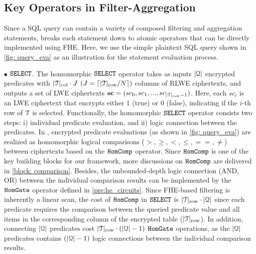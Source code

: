 \subsection{Key Operators in Filter-Aggregation}\label{block: overview}
Since a SQL query can contain a variety of composed filtering and aggregation statements,
\NAME breaks each statement down to atomic operators that can be directly
implemented using FHE.
Here, we use the simple plaintext SQL query shown in \cref{fig: query_eva} as an illustration
for the statement evaluation process.

$\bullet$ $\boldsymbol{\texttt{SELECT}}$. 
The homomorphic $\texttt{SELECT}$ operator takes as inputs
$\lvert {\mathcal{Q}} \rvert$ encrypted predicates with 
$|\mathcal{T}|_{\rm col} \cdot J$ $(J=\lceil |\mathcal{T}|_{\rm row}/N\rceil)$ columns of RLWE ciphertexts,
and outputs a set of LWE ciphertexts
$\mathbf{sc} = (sc_0, sc_1 ,..., sc_{|\mathcal{T}|_{\rm row}-1})$.
Here, each $sc_i$ is an LWE
ciphertext that encrypts either $1$ (true) or $0$ (false), 
indicating if the $i$-th row of $\mathcal{T}$ is selected.
Functionally, the homomorphic $\texttt{SELECT}$ operator consists
two steps: i) individual predicate evaluation, and ii) logic
connection between the predicates.
In \NAME, encrypted predicate evaluations (as shown in \cref{fig: query_eva})
are realized as homomorphic logical comparisons ($>, \geq, <, \leq, ==, \ne$)
between ciphertexts based on the $\texttt{HomComp}$ operator. Since
$\texttt{HomComp}$ is one of the key building blocks for our framework, 
more discussions on $\texttt{HomComp}$ are delivered in \cref{block: comparison}.
Besides, the unbounded-depth logic connection (AND, OR) between the 
individual comparison results
can be implemented by the $\texttt{HomGate}$ operator defined in 
\cref{pre:he_circuits}. Since FHE-based filtering is inherently a
linear scan, the cost of $\texttt{HomComp}$ in $\texttt{SELECT}$ is $|\mathcal{T}|_{\rm row} \cdot 
\lvert {\mathcal{Q}} \rvert$ since 
each predicate requires the comparison between the queried predicate value and
all items in the corresponding column of the encrypted table ($|\mathcal{T}|_{\rm row}$).
In addition, connecting $\lvert {\mathcal{Q}} \rvert$ predicates cost $|\mathcal{T}|_{\rm row} \cdot (\lvert {\mathcal{Q}} \rvert - 1)$  
$\texttt{HomGate}$ operations, as the $\lvert {\mathcal{Q}} \rvert$ predicates contains $(\lvert {\mathcal{Q}} \rvert - 1)$
logic connections between the individual comparison results.

